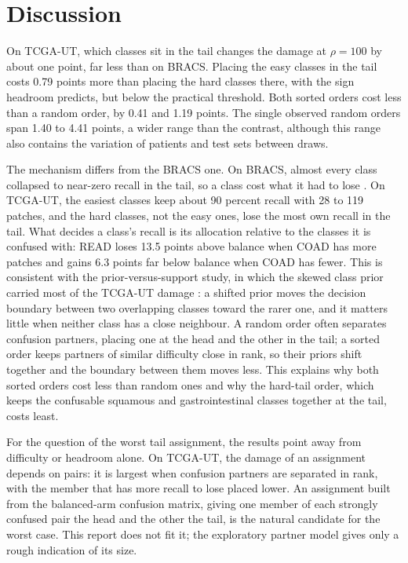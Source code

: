\section{Discussion}
\label{sec:discussion}
On TCGA-UT, which classes sit in the tail changes the damage at $\rho=100$ by about one point, far less than on BRACS. Placing the easy classes in the tail costs 0.79 points more than placing the hard classes there, with the sign headroom predicts, but below the practical threshold. Both sorted orders cost less than a random order, by 0.41 and 1.19 points. The single observed random orders span 1.40 to 4.41 points, a wider range than the contrast, although this range also contains the variation of patients and test sets between draws.

The mechanism differs from the BRACS one. On BRACS, almost every class collapsed to near-zero recall in the tail, so a class cost what it had to lose \citep{queisler2026tailBracs}. On TCGA-UT, the easiest classes keep about 90 percent recall with 28 to 119 patches, and the hard classes, not the easy ones, lose the most own recall in the tail. What decides a class's recall is its allocation relative to the classes it is confused with: READ loses 13.5 points above balance when COAD has more patches and gains 6.3 points far below balance when COAD has fewer. This is consistent with the prior-versus-support study, in which the skewed class prior carried most of the TCGA-UT damage \citep{queisler2026causeTcga}: a shifted prior moves the decision boundary between two overlapping classes toward the rarer one, and it matters little when neither class has a close neighbour. A random order often separates confusion partners, placing one at the head and the other in the tail; a sorted order keeps partners of similar difficulty close in rank, so their priors shift together and the boundary between them moves less. This explains why both sorted orders cost less than random ones and why the hard-tail order, which keeps the confusable squamous and gastrointestinal classes together at the tail, costs least.

For the question of the worst tail assignment, the results point away from difficulty or headroom alone. On TCGA-UT, the damage of an assignment depends on pairs: it is largest when confusion partners are separated in rank, with the member that has more recall to lose placed lower. An assignment built from the balanced-arm confusion matrix, giving one member of each strongly confused pair the head and the other the tail, is the natural candidate for the worst case. This report does not fit it; the exploratory partner model gives only a rough indication of its size.

